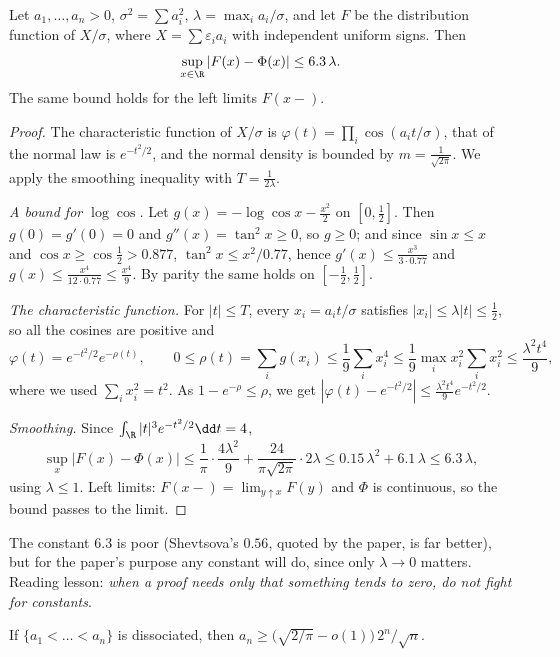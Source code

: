 \begin{proposition}\label{prop:berryrad}
Let $a_1,\dots,a_n>0$, $\sigma^2=\sum a_i^2$, $\lambda=\max_ia_i/\sigma$, and let $F$ be the distribution function of $X/\sigma$, where $X=\sum\varepsilon_ia_i$ with independent
uniform signs. Then
\[
\sup_{x\in\R}|F(x)-\Phi(x)|\le6.3\,\lambda.
\]
The same bound holds for the left limits $F(x-)$.
\end{proposition}

\begin{proof}
The characteristic function of $X/\sigma$ is $\varphi(t)=\prod_i\cos(a_it/\sigma)$, that of the normal law is $e^{-t^2/2}$, and the normal density is bounded by $m=\frac1{\sqrt{2\pi}}$.
We apply the smoothing inequality with $T=\frac1{2\lambda}$.

\emph{A bound for $\log\cos$.} Let $g(x)=-\log\cos x-\frac{x^2}2$ on $[0,\frac12]$. Then $g(0)=g'(0)=0$ and $g''(x)=\tan^2x\ge0$, so $g\ge0$; and since $\sin x\le x$ and $\cos x\ge\cos\frac12>0.877$,
$\tan^2x\le x^2/0.77$, hence $g'(x)\le\frac{x^3}{3\cdot0.77}$ and $g(x)\le\frac{x^4}{12\cdot0.77}\le\frac{x^4}9$. By parity the same holds on $[-\frac12,\frac12]$.

\emph{The characteristic function.} For $|t|\le T$, every $x_i=a_it/\sigma$ satisfies $|x_i|\le\lambda|t|\le\frac12$, so all the cosines are positive and
\[
\varphi(t)=e^{-t^2/2}e^{-\rho(t)},\qquad 0\le\rho(t)=\sum_ig(x_i)\le\frac19\sum_ix_i^4\le\frac19\max_ix_i^2\sum_ix_i^2\le\frac{\lambda^2t^4}9,
\]
where we used $\sum_ix_i^2=t^2$. As $1-e^{-\rho}\le\rho$, we get $|\varphi(t)-e^{-t^2/2}|\le\frac{\lambda^2t^4}9e^{-t^2/2}$.

\emph{Smoothing.} Since $\int_\R|t|^3e^{-t^2/2}\dd t=4$,
\[
\sup_x|F(x)-\Phi(x)|\le\frac1\pi\cdot\frac{4\lambda^2}9+\frac{24}{\pi\sqrt{2\pi}}\cdot2\lambda\le0.15\,\lambda^2+6.1\,\lambda\le6.3\,\lambda,
\]
using $\lambda\le1$. Left limits: $F(x-)=\lim_{y\uparrow x}F(y)$ and $\Phi$ is continuous, so the bound passes to the limit.
\end{proof}

The constant $6.3$ is poor (Shevtsova's $0.56$, quoted by the paper, is far better), but for the paper's purpose any constant will do, since only
$\lambda\to0$ matters. Reading lesson: \emph{when a proof needs only that something tends to zero, do not fight for constants}.

\begin{theorem}\label{thm:dfxone}
If $\{a_1<\dots<a_n\}$ is dissociated, then $a_n\ge\bigl(\sqrt{2/\pi}-o(1)\bigr)\,2^n/\sqrt n$.
\end{theorem}

